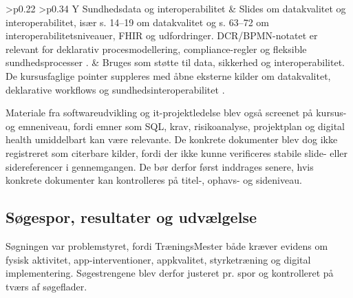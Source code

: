 \begin{center}
\begin{tabularx}{\textwidth}{>{\RaggedRight\arraybackslash}p{} >{\RaggedRight\arraybackslash}p{} Y}
Sundhedsdata og interoperabilitet & Slides om datakvalitet og interoperabilitet, især s. 14--19 om datakvalitet og s. 63--72 om interoperabilitetsniveauer, FHIR og udfordringer. DCR/BPMN-notatet er relevant for deklarativ procesmodellering, compliance-regler og fleksible sundhedsprocesser \cite{zajac2026_data_quality_interoperability,ku2026_dcr_bpmn_modeling}. & Bruges som støtte til data, sikkerhed og interoperabilitet. De kursusfaglige pointer suppleres med åbne eksterne kilder om datakvalitet, deklarative workflows og sundhedsinteroperabilitet \cite{mohammed2025_five_facets_data_quality,vanderalst2009_declarative_workflows,benson2016_principles_health_interoperability}. \\
\bottomrule
\end{tabularx}
\label{tab:kursusmateriale-gennemgang}
\end{center}

Materiale fra softwareudvikling og it-projektledelse blev også screenet på kursus- og emneniveau, fordi emner som SQL, krav, risikoanalyse, projektplan og digital health umiddelbart kan være relevante. De konkrete dokumenter blev dog ikke registreret som citerbare kilder, fordi der ikke kunne verificeres stabile slide- eller sidereferencer i gennemgangen. De bør derfor først inddrages senere, hvis konkrete dokumenter kan kontrolleres på titel-, ophavs- og sideniveau.

\subsection{Søgespor, resultater og udvælgelse}

Søgningen var problemstyret, fordi TræningsMester både kræver evidens om fysisk aktivitet, app-interventioner, appkvalitet, styrketræning og digital implementering. Søgestrengene blev derfor justeret pr. spor og kontrolleret på tværs af søgeflader.

